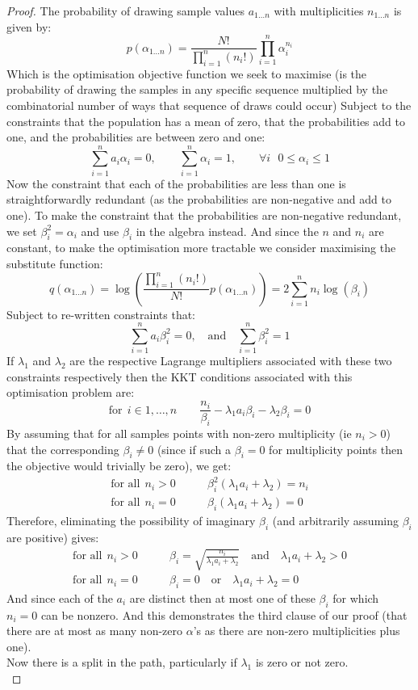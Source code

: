 \documentclass[12pt]{colt2020} %
\begin{document}
\begin{proof}
The probability of drawing sample values $a_{1\dots n}$ with multiplicities $n_{1\dots n}$ is given by:
$$p(\alpha_{1\dots n}) = \frac{N!}{\prod_{i=1}^n(n_i!)}\prod_{i=1}^n \alpha_i^{n_i} $$
Which is the optimisation objective function we seek to maximise
(is the probability of drawing the samples in any specific sequence multiplied by the combinatorial number of ways that sequence of draws could occur)
Subject to the constraints that the population has a mean of zero, that the probabilities add to one, and the probabilities are between zero and one:
$$\sum_{i=1}^na_i\alpha_i=0, \quad\quad \sum_{i=1}^n\alpha_i=1, \quad\quad \forall i ~~~0\le\alpha_i\le 1$$
Now the constraint that each of the probabilities are less than one is straightforwardly redundant (as the probabilities are non-negative and add to one).
To make the constraint that the probabilities are non-negative redundant, we set $\beta_i^2=\alpha_i$ and use $\beta_i$ in the algebra instead.
And since the $n$ and $n_i$ are constant, to make the optimisation more tractable we consider maximising the substitute function: $$q(\alpha_{1\dots n}) = \log\left(\frac{\prod_{i=1}^n(n_i!)}{N!}p(\alpha_{1\dots n})\right) = 2\sum_{i=1}^nn_i\log(\beta_i)$$
Subject to re-written constraints that:
\begin{equation}\label{constraints_1}\sum_{i=1}^na_i\beta_i^2=0, \quad\text{and}\quad \sum_{i=1}^n\beta_i^2=1\end{equation}
If $\lambda_1$ and $\lambda_2$ are the respective Lagrange multipliers associated with these two constraints respectively then the KKT conditions associated with this optimisation problem are:
$$\text{for}~~i\in{1,\dots,n}\quad\quad \frac{n_i}{\beta_i} - \lambda_1 a_i\beta_i - \lambda_2\beta_i = 0 $$
By assuming that for all samples points with non-zero multiplicity (ie $n_i>0$) that the corresponding $\beta_i\ne 0$ (since if such a $\beta_i=0$ for multiplicity points then the objective would trivially be zero), we get:
\begin{align*}\text{for all}~~n_i>0\quad\quad &\beta_i^2(\lambda_1 a_i + \lambda_2) = n_i \\
\text{for all}~~n_i=0\quad\quad &\beta_i(\lambda_1 a_i + \lambda_2) = 0 \end{align*}
Therefore, eliminating the possibility of imaginary $\beta_i$ (and arbitrarily assuming $\beta_i$ are positive) gives:
\begin{align*}\text{for all}~~n_i>0\quad\quad &\beta_i = \sqrt{\frac{n_i}{\lambda_1 a_i + \lambda_2}} \quad \text{and} \quad \lambda_1 a_i + \lambda_2 > 0 \\
\text{for all}~~n_i=0\quad\quad &\beta_i = 0 \quad \text{or} \quad \lambda_1 a_i + \lambda_2 = 0 \end{align*}
And since each of the $a_i$ are distinct then at most one of these $\beta_i$ for which $n_i=0$ can be nonzero.
And this demonstrates the third clause of our proof (that there are at most as many non-zero $\alpha$'s as there are non-zero multiplicities plus one).\\
Now there is a split in the path, particularly if $\lambda_1$ is zero or not zero.\\


\end{proof}
\end{document}
